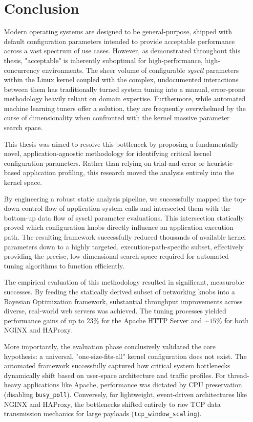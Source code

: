 \chapter{Conclusion} \label{ch:conclusion}

Modern operating systems are designed to be general-purpose, shipped with default configuration parameters intended to provide acceptable performance across a vast spectrum of use cases.
However, as demonstrated throughout this thesis, "acceptable" is inherently suboptimal for high-performance, high-concurrency environments.
The sheer volume of configurable \textit{sysctl} parameters within the Linux kernel coupled with the complex, undocumented interactions between them has traditionally turned system tuning into a manual, error-prone methodology heavily reliant on domain expertise.
Furthermore, while automated machine learning tuners offer a solution, they are frequently overwhelmed by the curse of dimensionality when confronted with the kernel massive parameter search space.

This thesis was aimed to resolve this bottleneck by proposing a fundamentally novel, application-agnostic methodology for identifying critical kernel configuration parameters.
Rather than relying on trial-and-error or heuristic-based application profiling, this research moved the analysis entirely into the kernel space.

By engineering a robust static analysis pipeline, we successfully mapped the top-down control flow of application system calls and intersected them with the bottom-up data flow of sysctl parameter evaluations.
This intersection statically proved which configuration knobs directly influence an application execution path.
The resulting framework successfully reduced thousands of available kernel parameters down to a highly targeted, execution-path-specific subset, effectively providing the precise, low-dimensional search space required for automated tuning algorithms to function efficiently.

The empirical evaluation of this methodology resulted in significant, measurable successes.
By feeding the statically derived subset of networking knobs into a Bayesian Optimization framework, substantial throughput improvements across diverse, real-world web servers was achieved.
The tuning processes yielded performance gains of up to $23\%$ for the Apache HTTP Server and $\sim 15\%$ for both NGINX and HAProxy.

More importantly, the evaluation phase conclusively validated the core hypothesis: a universal, "one-size-fits-all" kernel configuration does not exist.
The automated framework successfully captured how critical system bottlenecks dynamically shift based on user-space architecture and traffic profiles.
For thread-heavy applications like Apache, performance was dictated by CPU preservation (disabling \texttt{busy\_poll}).
Conversely, for lightweight, event-driven architectures like NGINX and HAProxy, the bottlenecks shifted entirely to raw TCP data transmission mechanics for large payloads (\texttt{tcp\_window\_scaling}).

